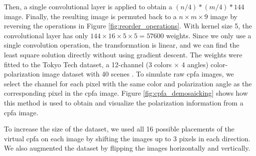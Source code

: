 Then, a single convolutional layer is applied to obtain a $(n/4)*(m/4)*144$ image.
Finally, the resulting image is permuted back to a $n \times m \times 9$ image by reversing the operations in Figure \ref{fig:reorder_operations}.
With kernel size 5, the convolutional layer has only $144\times16\times5\times5=57600$ weights.
Since we only use a single convolution operation, the transformation is linear, and we can find the least square solution directly without using gradient descent.
The weights were fitted to the Tokyo Tech dataset, a 12-channel (3 colors $\times$ 4 angles) color-polarization image dataset with 40 scenes \cite{morimatsuMonochromeColorPolarization2020,morimatsuMonochromeColorPolarization2021}.
To simulate raw \gls{cpfa} images, we select the channel for each pixel with the same color and polarization angle as the corresponding pixel in the \gls{cpfa} image.
Figure \ref{fig:cpfa_demosaicking} shows how this method is used to obtain and visualize the polarization information from a \gls{cpfa} image.

To increase the size of the dataset, we used all 16 possible placements of the virtual \gls{cpfa} on each image by shifting the images up to 3 pixels in each direction.
We also augmented the dataset by flipping the images horizontally and vertically.


